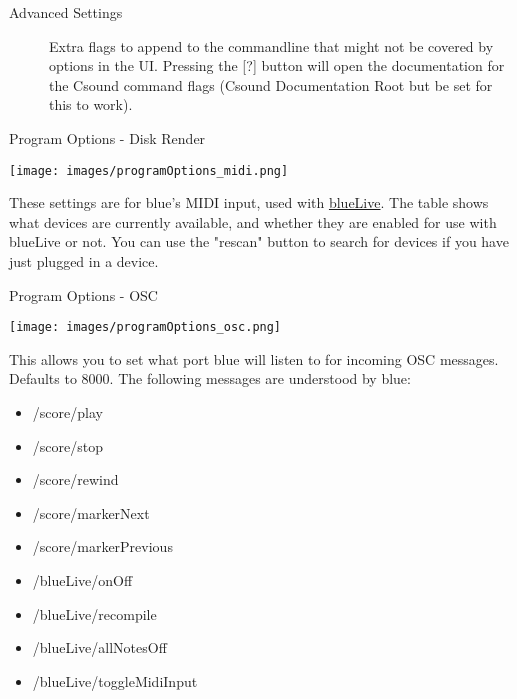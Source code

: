 \begin{description}
\item[Advanced Settings]
Extra flags to append to the commandline that might not be covered by
options in the UI. Pressing the {[}?{]} button will open the
documentation for the Csound command flags (Csound Documentation Root
but be set for this to work).
\end{description}

Program Options - Disk Render

\texttt{[image: images/programOptions\_midi.png]}

These settings are for blue's MIDI input, used with
\protect\hyperlink{blueLive}{blueLive}. The table shows what devices are
currently available, and whether they are enabled for use with blueLive
or not. You can use the "rescan" button to search for devices if you
have just plugged in a device.

Program Options - OSC

\texttt{[image: images/programOptions\_osc.png]}

This allows you to set what port blue will listen to for incoming OSC
messages. Defaults to 8000. The following messages are understood by
blue:

\begin{itemize}
\item
  /score/play
\item
  /score/stop
\item
  /score/rewind
\item
  /score/markerNext
\item
  /score/markerPrevious
\item
  /blueLive/onOff
\item
  /blueLive/recompile
\item
  /blueLive/allNotesOff
\item
  /blueLive/toggleMidiInput
\end{itemize}
